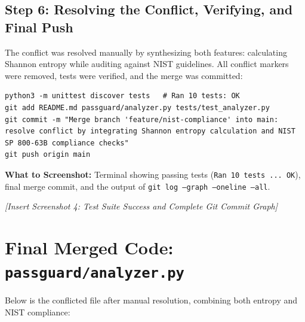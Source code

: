\documentclass[11pt,a4paper]{article}
\begin{document}
\subsection{Step 6: Resolving the Conflict, Verifying, and Final Push}
The conflict was resolved manually by synthesizing both features: calculating Shannon entropy while auditing against NIST guidelines. All conflict markers were removed, tests were verified, and the merge was committed:
\begin{lstlisting}[style=terminal]
python3 -m unittest discover tests   # Ran 10 tests: OK
git add README.md passguard/analyzer.py tests/test_analyzer.py
git commit -m "Merge branch 'feature/nist-compliance' into main: resolve conflict by integrating Shannon entropy calculation and NIST SP 800-63B compliance checks"
git push origin main
\end{lstlisting}

\begin{tcolorbox}[colback=green!4!white,colframe=green!60!black,title=\textbf{Screenshot Placeholder 4: Conflict Resolution, Tests, and Final Git Graph}]
\textbf{What to Screenshot:} Terminal showing passing tests (\texttt{Ran 10 tests ... OK}), final merge commit, and the output of \texttt{git log --graph --oneline --all}.
\vspace{2.5cm}
\begin{center}
\textit{[Insert Screenshot 4: Test Suite Success and Complete Git Commit Graph]}
\end{center}
\end{tcolorbox}

\section{Final Merged Code: \texttt{passguard/analyzer.py}}
Below is the conflicted file after manual resolution, combining both entropy and NIST compliance:
\end{document}
